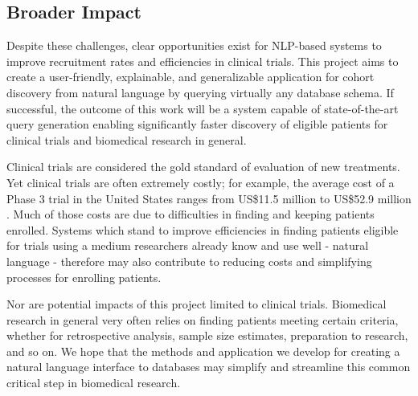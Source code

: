 \documentclass[../main.tex]{subfiles}
\begin{document}
\subsection{Broader Impact}

Despite these challenges, clear opportunities exist for NLP-based systems to improve recruitment rates and efficiencies in clinical trials. This project aims to create a user-friendly, explainable, and generalizable application for cohort discovery from natural language by querying virtually any database schema. If successful, the outcome of this work will be a system capable of state-of-the-art query generation enabling significantly faster discovery of eligible patients for clinical trials and biomedical research in general.

Clinical trials are considered the gold standard of evaluation of new treatments. Yet clinical trials are often extremely costly; for example, the average cost of a Phase 3 trial in the United States ranges from US\$11.5 million to US\$52.9 million \cite{sertkaya2016key}. Much of those costs are due to difficulties in finding and keeping patients enrolled. Systems which stand to improve efficiencies in finding patients eligible for trials using a medium researchers already know and use well - natural language - therefore may also contribute to reducing costs and simplifying processes for enrolling patients. 

Nor are potential impacts of this project limited to clinical trials. Biomedical research in general very often relies on finding patients meeting certain criteria, whether for retrospective analysis, sample size estimates, preparation to research, and so on. We hope that the methods and application we develop for creating a natural language interface to databases may simplify and streamline this common critical step in biomedical research.
\end{document}
